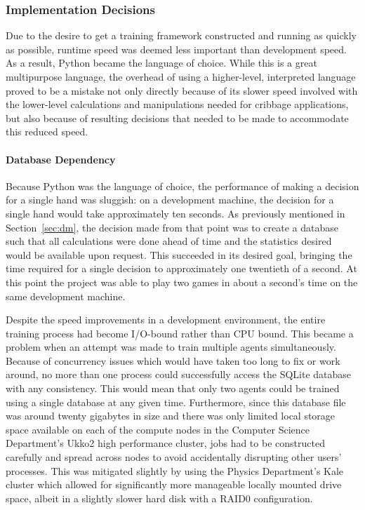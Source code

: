 
\subsubsection*{Implementation Decisions}
\label{sec:disc-future-implementation}

Due to the desire to get a training framework constructed
and running as quickly as possible,
runtime speed was deemed less important than development speed.
%
As a result,
Python became the language of choice.
%
While this is a great multipurpose language,
the overhead of using a higher-level, interpreted language
proved to be a mistake
not only directly because of its slower speed involved with the
lower-level calculations and manipulations needed for cribbage applications,
but also because of resulting decisions that needed to be made to accommodate
this reduced speed.


\paragraph*{Database Dependency}

Because Python was the language of choice,
the performance of making a decision for a single hand was sluggish:
on a development machine,
the decision for a single hand would take approximately ten seconds.
%
As previously mentioned in Section~\ref{sec:dm},
the decision made from that point was to create a database such that all
calculations were done ahead of time
and the statistics desired would be available upon request.
%
This succeeded in its desired goal,
bringing the time required for a single decision to approximately
one twentieth of a second.
%
At this point the project was able to play two games in about a second's time
on the same development machine.

Despite the speed improvements in a development environment,
the entire training process had become I/O-bound rather
than CPU bound.
%
This became a problem when  an attempt was made to train multiple
agents simultaneously.
%
Because of concurrency issues which would have
taken too long to fix or work around,
no more than one process could successfully access the SQLite database with any
consistency.
%
This would mean that only two agents could be trained using a single database
at any given time.
%
Furthermore,
since this database file was around twenty gigabytes in size and
there was only limited local storage space available
on each of the compute nodes in the Computer Science Department's Ukko2 high
performance cluster,
jobs had to be constructed carefully and spread across nodes to avoid
accidentally disrupting other users' processes.
%
This was mitigated slightly by using the Physics Department's Kale cluster
which allowed for significantly more manageable locally mounted drive space,
albeit in a slightly slower hard disk with a RAID0 configuration.

